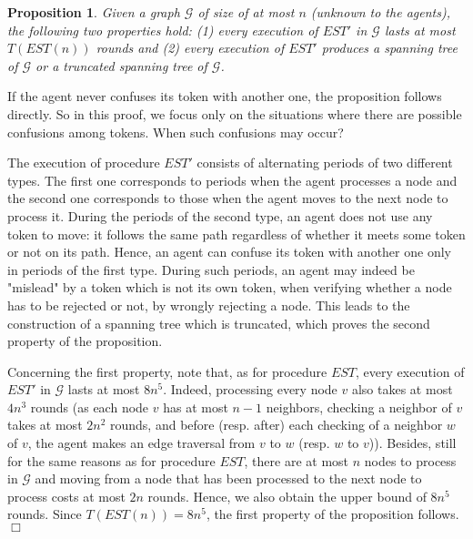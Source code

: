 \documentclass[11pt]{article}
\newtheorem{proposition}{Proposition}[section]
\newcommand{\qed}{\hfill $\Box$ \bigbreak}
\newenvironment{proof}{\noindent {\bf Proof.}}{\qed}
\begin{document}
{
\begin{proposition}
\label{prop1}
Given a graph $\mathcal{G}$ of size {of at most $n$} (unknown to the agents), the following two properties hold: (1) every execution of $EST'$ in $\mathcal{G}$ lasts at most $T(EST(n))$ rounds and (2) every execution of $EST'$ produces a spanning tree of $\mathcal{G}$ or a truncated spanning tree of $\mathcal{G}$.
\end{proposition}}

\begin{proof}
{If the agent never confuses its token with another one, the proposition follows directly. So in this proof, we focus only on the situations where there are possible confusions among tokens. When such confusions may occur? }

{The execution of procedure $EST'$ consists of alternating periods of two different types. The first one corresponds to periods when the agent processes a node and the second one corresponds to those when the agent moves to the next node to process it. During the periods of the second type, an agent does not use any token to move: it follows the same path regardless of whether it meets some token or not on its path. Hence, an agent can confuse its token with another one only in periods of the first type. During such periods, an agent may indeed be "mislead" by a token which is not its own token, when verifying whether a node has to be rejected or not, by wrongly rejecting a node. This leads to the construction of a spanning tree which is truncated, which proves the second property of the proposition.}

{Concerning the first property, note that, as for procedure $EST$, every execution of $EST'$ in $\mathcal{G}$ lasts at most $8n^5$. Indeed,  processing every node $v$ also takes at most $4n^3$ rounds (as each node $v$ has at most $n-1$ neighbors, checking a neighbor of $v$ takes at most $2n^2$ rounds, and before (resp. after) each checking of a neighbor $w$ of $v$, the agent makes an edge traversal from $v$ to $w$ (resp. $w$ to $v$)). Besides, still for the same reasons as for procedure $EST$, there are at most $n$ nodes to process in $\mathcal{G}$ and moving from a node that has been processed to the next node to process costs at most $2n$ rounds. Hence, we also obtain the upper bound of $8n^5$ rounds. Since $T(EST(n))=8n^5$, the first property of the proposition follows.}
\end{proof}
 
\end{document}
